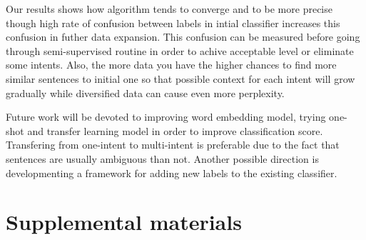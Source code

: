\documentclass[11pt]{article}
\begin{document}
Our results shows how algorithm tends to converge and to be more precise though high rate of confusion between labels in intial classifier increases this confusion in futher data expansion. This confusion can be measured before going through semi-supervised routine in order to achive acceptable level or eliminate some intents. Also, the more data you have the higher chances to find more similar sentences to initial one so that possible context for each intent will grow gradually while diversified data can cause even more perplexity.

Future work will be devoted to improving word embedding model, trying one-shot and transfer learning model in order to improve classification score. Transfering from one-intent to multi-intent is preferable due to the fact that sentences are usually ambiguous than not. Another possible direction is developmenting a framework for adding new labels to the existing classifier.





\section{Supplemental materials}
\end{document}
